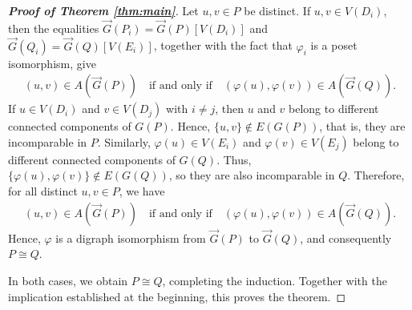 \documentclass[10pt,a4paper]{amsart}
\begin{document}
\begin{proof}[\rm\textbf{Proof of Theorem \ref{thm:main}}]
Let $u,v\in P$ be distinct.
If $u,v\in V(D_i)$, then the equalities
$\vec G(P_i)=\vec G(P)[V(D_i)]$ and $\vec G(Q_i)=\vec G(Q)[V(E_i)]$,
together with the fact that $\varphi_i$ is a poset isomorphism, give 
\begin{eqnarray*}
(u,v)\in A(\vec G(P))\quad\text{if and only if}\quad(\varphi(u),\varphi(v))\in A(\vec G(Q)).
\end{eqnarray*}
If $u\in V(D_i)$ and $v\in V(D_j)$ with $i\neq j$,
then $u$ and $v$ belong to different connected components of $G(P)$.
Hence, $\{u,v\}\notin E(G(P))$,
that is, they are incomparable in $P$.
Similarly, $\varphi(u)\in V(E_i)$ and $\varphi(v)\in V(E_j)$
belong to different connected components of $G(Q)$.
Thus, $\{\varphi(u),\varphi(v)\}\notin E(G(Q))$,
so they are also incomparable in $Q$.
Therefore, for all distinct $u,v\in P$, we have
\begin{eqnarray*}
(u,v)\in A(\vec G(P))\quad\text{if and only if}\quad(\varphi(u),\varphi(v))\in A(\vec G(Q)).
\end{eqnarray*}
Hence, $\varphi$ is a digraph isomorphism from $\vec G(P)$ to $\vec G(Q)$,
and consequently $P\cong Q$.

In both cases, we obtain $P\cong Q$, completing the induction.
Together with the implication established at the beginning,
this proves the theorem.
\end{proof}
\end{document}
